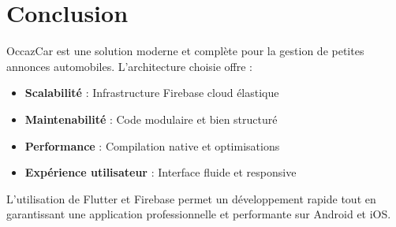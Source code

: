 \documentclass[11pt,a4paper]{article}
\begin{document}
\section{Conclusion}

OccazCar est une solution moderne et complète pour la gestion de petites annonces automobiles. L'architecture choisie offre :

\begin{itemize}
    \item \textbf{Scalabilité} : Infrastructure Firebase cloud élastique
    \item \textbf{Maintenabilité} : Code modulaire et bien structuré
    \item \textbf{Performance} : Compilation native et optimisations
    \item \textbf{Expérience utilisateur} : Interface fluide et responsive
\end{itemize}

L'utilisation de Flutter et Firebase permet un développement rapide tout en garantissant une application professionnelle et performante sur Android et iOS.
\end{document}
